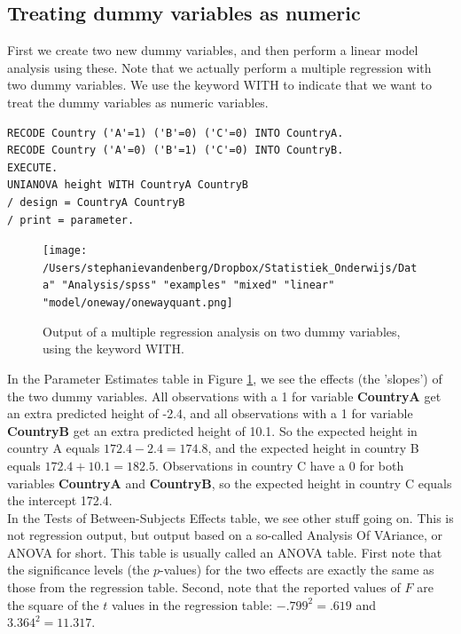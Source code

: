 \documentclass[]{report}\usepackage[]{graphicx}\usepackage[]{color}
\begin{document}
\subsection{Treating dummy variables as numeric}


First we create two new dummy variables, and then perform a linear model analysis using these. Note that we actually perform a multiple regression with two dummy variables. We use the keyword WITH to indicate that we want to treat the dummy variables as numeric variables.


\begin{verbatim}
RECODE Country ('A'=1) ('B'=0) ('C'=0) INTO CountryA.
RECODE Country ('A'=0) ('B'=1) ('C'=0) INTO CountryB.
EXECUTE.
UNIANOVA height WITH CountryA CountryB
/ design = CountryA CountryB
/ print = parameter.
\end{verbatim}


\begin{figure}[h]
    \begin{center}
       \texttt{[image: /Users/stephanievandenberg/Dropbox/Statistiek\_Onderwijs/Data" "Analysis/spss" "examples" "mixed" "linear" "model/oneway/onewayquant.png]}
    \end{center}
    \caption{Output of a multiple regression analysis on two dummy variables, using the keyword WITH.}
    \label{fig:dummy_21}
\end{figure}


In the Parameter Estimates table in Figure \ref{fig:dummy_21}, we see the effects (the 'slopes') of the two dummy variables. All observations with a 1 for variable \textbf{CountryA} get an extra predicted height of -2.4, and all observations with a 1 for variable \textbf{CountryB} get an extra predicted height of 10.1. So the expected height in country A equals $172.4 - 2.4 = 174.8$, and the expected height in country B equals $172.4+10.1=182.5 $. Observations in country C have a 0 for both variables \textbf{CountryA} and \textbf{CountryB}, so the expected height in country C equals the intercept 172.4.\\

In the Tests of Between-Subjects Effects table, we see other stuff going on. This is not regression output, but output based on a so-called Analysis Of VAriance, or ANOVA for short. This table is usually called an ANOVA table. First note that the significance levels (the $p$-values) for the two effects are exactly the same as those from the regression table. Second, note that the reported values of $F$ are the square of the $t$ values in the regression table: $-.799^2=.619$ and $3.364^2=11.317$. \\
\end{document}
